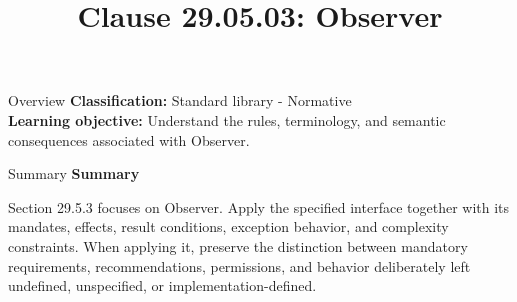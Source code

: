 \documentclass[10pt,letterpaper]{article}
\title{Clause 29.05.03: Observer}
\author{}
\date{}
\begin{document}
\maketitle
\begin{CornellOverviewBox}{Overview}
\textbf{Classification:} Standard library - Normative\\[2pt]
\textbf{Learning objective:} Understand the rules, terminology, and semantic consequences associated with Observer.
\end{CornellOverviewBox}\begin{CornellSummaryBox}{Summary}
{\sffamily\bfseries\color{Accent} Summary}\par\vspace{3pt}Section 29.5.3 focuses on Observer. Apply the specified interface together with its mandates, effects, result conditions, exception behavior, and complexity constraints. When applying it, preserve the distinction between mandatory requirements, recommendations, permissions, and behavior deliberately left undefined, unspecified, or implementation-defined.
\end{CornellSummaryBox}
\end{document}
